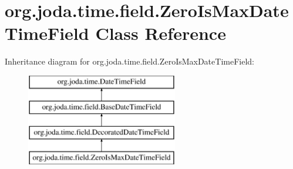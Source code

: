 \hypertarget{classorg_1_1joda_1_1time_1_1field_1_1_zero_is_max_date_time_field}{\section{org.\-joda.\-time.\-field.\-Zero\-Is\-Max\-Date\-Time\-Field Class Reference}
\label{classorg_1_1joda_1_1time_1_1field_1_1_zero_is_max_date_time_field}
}
Inheritance diagram for org.\-joda.\-time.\-field.\-Zero\-Is\-Max\-Date\-Time\-Field\-:\begin{figure}[H]
\begin{center}
\leavevmode
\includegraphics[height=4.000000cm]{classorg_1_1joda_1_1time_1_1field_1_1_zero_is_max_date_time_field}
\end{center}
\end{figure}
